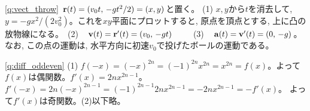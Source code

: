 \ref{q:vect_throw} ${\bf r}(t)=(v_0t,\, -gt^2/2)=(x, y)$と置く。
(1) $x, y$から$t$を消去して, $y=-gx^2/(2v_0^2)$。これを$xy$平面にプロットすると, 
原点を頂点とする, 上に凸の放物線になる。　(2)　${\bf v}(t)={\bf r}'(t)=(v_0,\, -gt)$　　
(3)　${\bf a}(t)={\bf v}'(t)=(0,\, -g)$。なお, この点の運動は, 水平方向に初速$v_0$で投げたボールの運動である。\mv

% 
\ref{q:diff_oddeven} (1) $f(-x)=(-x)^{2n}=
(-1)^{2n}x^{2n}=x^{2n}=f(x)$。よって$f(x)$は偶関数。$f'(x)=2nx^{2n-1}$。
$f'(-x)=2n(-x)^{2n-1}=(-1)^{2n-1}2nx^{2n-1}=-2nx^{2n-1}=-f'(x)$。
よって$f'(x)$は奇関数。(2)以下略。

